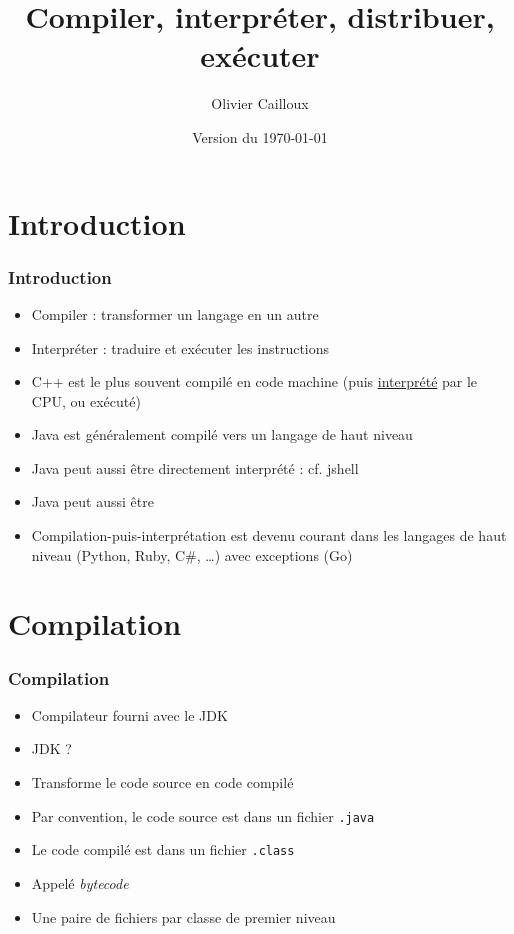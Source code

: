 \documentclass[english, french]{beamer}
\title{Compiler, interpréter, distribuer, exécuter}
\author{Olivier Cailloux}
\institute[LAMSADE]{LAMSADE, Université Paris-Dauphine}
\date{Version du \today}
\begin{document}
\begin{frame}[plain]
	\titlepage
\end{frame}
\addtocounter{framenumber}{-1}

\section{Introduction}
\begin{frame}
	\frametitle{Introduction}
	\begin{itemize}
		\item Compiler : transformer un langage en un autre
		\item Interpréter : traduire et exécuter les instructions
		\item C++ est le plus souvent compilé en code machine (puis \href{https://stackoverflow.com/a/9547498/}{interprété} par le CPU, ou \og{}exécuté\fg{})
		\item Java est généralement compilé vers un langage de haut niveau
		\item Java peut aussi être directement interprété : cf. jshell
		\item Java peut aussi être 
		\item Compilation-puis-interprétation est devenu courant dans les langages de haut niveau (Python, Ruby, C\#, …) avec exceptions (Go)
	\end{itemize}
\end{frame}

\section{Compilation}
\begin{frame}
	\frametitle{Compilation}
	\begin{itemize}
		\item Compilateur fourni avec le JDK
		\item JDK ? \onslide<2>{Java Development Kit}
		\item Transforme le code source en code compilé
		\item Par convention, le code source est dans un fichier \texttt{.java}
		\item Le code compilé est dans un fichier \texttt{.class}
		\item Appelé \emph{bytecode}
		\item Une paire de fichiers par classe {\tiny de premier niveau}
	\end{itemize}
\end{frame}
\end{document}
